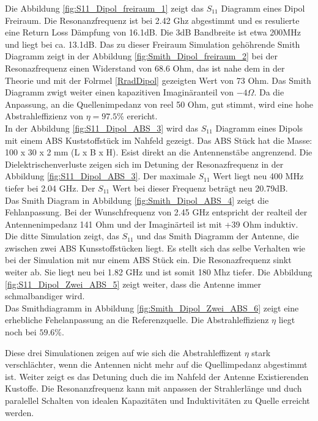 Die Abbildung \ref{fig:S11_Dipol_freiraum_1} zeigt das $S_{11}$ Diagramm eines Dipol Freiraum. Die Resonanzfrequenz ist bei 2.42 Ghz abgestimmt und es resulierte eine Return Loss Dämpfung von 16.1dB. Die 3dB Bandbreite ist etwa 200MHz und liegt bei ca. 13.1dB. Das zu dieser Freiraum Simulation gehöhrende Smith Diagramm zeigt in der Abbildung \ref{fig:Smith_Dipol_freiraum_2}  bei der Resonazfrequenz einen Widerstand von 68.6 Ohm, das ist nahe dem in der Theorie und mit der Folrmel \ref{RradDipol} gezeigten Wert von 73 Ohm. Das Smith Diagramm zwigt weiter einen kapazitiven  Imaginäranteil von $-4\Omega$. Da die Anpassung, an die Quellenimpedanz von reel 50 Ohm, gut stimmt, wird eine hohe Abstrahleffizienz von $\eta = 97.5 \% $ erericht.\\

In der Abbildung \ref{fig:S11_Dipol_ABS_3} wird das $S_{11}$ Diagramm eines Dipols mit einem ABS Kuststoffstück im Nahfeld gezeigt. Das ABS Stück hat die Masse: 100 x 30 x 2 mm (L x B x H). Esist direkt an die Antennenstäbe angrenzend. Die Dielektrischenverluste zeigen sich im Detuning der Resonazfrequenz in der Abbildung \ref{fig:S11_Dipol_ABS_3}. Der maximale $S_{11}$ Wert liegt neu 400 MHz tiefer bei 2.04 GHz. Der $S_{11}$ Wert bei dieser Frequenz beträgt  neu 20.79dB.\\
Das Smith Diagram in Abbildung \ref{fig:Smith_Dipol_ABS_4} zeigt die Fehlanpassung. Bei der Wunschfrequenz von 2.45 GHz entspricht der realteil der Antennenimpedanz 141 Ohm und der Imaginärteil ist mit +39 Ohm induktiv.\\

Die ditte Simulation zeigt, das $S_{11}$ und das Smith Diagramm der Antenne, die zwischen zwei ABS Kunsstoffstücken liegt. Es stellt sich das selbe Verhalten wie bei der Simulation mit nur einem ABS Stück ein. Die Resonazfrequenz sinkt weiter ab. Sie liegt neu bei 1.82 GHz und ist somit 180 Mhz tiefer. Die Abbildung  \ref{fig:S11_Dipol_Zwei_ABS_5} zeigt weiter, dass die Antenne immer schmalbandiger wird.\\
Das Smithdiagramm in Abbildung \ref{fig:Smith_Dipol_Zwei_ABS_6} zeigt eine erhebliche Fehelanpassung an die Referenzquelle. Die Abstrahleffizienz $\eta$ liegt noch bei $59.6 \%$.

Diese drei Simulationen zeigen auf wie sich die Abstrahleffizent $\eta$ stark verschlächter, wenn die Antennen nicht mehr auf die Quellimpedanz abgestimmt ist. Weiter zeigt es das Detuning duch die im Nahfeld der Antenne Existierenden Kustoffe. Die Resonanzfrequenz kann mit anpassen der Strahlerlänge und duch paralellel Schalten von idealen Kapazitäten und Induktivitäten zu Quelle erreicht werden.

